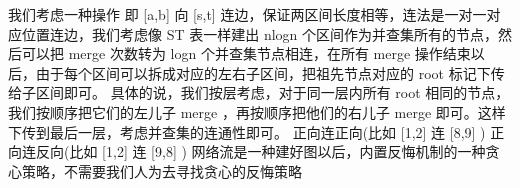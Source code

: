 {}\markdownRendererInterblockSeparator
{}
\markdownRendererSectionEnd \markdownRendererSectionBegin
{}\markdownRendererInterblockSeparator
{}我们考虑一种操作 即\markdownRendererDollarSign{} [a,b] \markdownRendererDollarSign{}向\markdownRendererDollarSign{} [s,t] \markdownRendererDollarSign{}连边，保证两区间长度相等，连法是一对一对应位置连边，我们考虑像\markdownRendererDollarSign{} ST \markdownRendererDollarSign{}表一样建出\markdownRendererDollarSign{} nlogn \markdownRendererDollarSign{}个区间作为并查集所有的节点，然后可以把\markdownRendererDollarSign{} merge \markdownRendererDollarSign{}次数转为\markdownRendererDollarSign{} logn \markdownRendererDollarSign{}个并查集节点相连，在所有\markdownRendererDollarSign{} merge \markdownRendererDollarSign{}操作结束以后，由于每个区间可以拆成对应的左右子区间，把祖先节点对应的\markdownRendererDollarSign{} root \markdownRendererDollarSign{}标记下传给子区间即可。\markdownRendererParagraphSeparator
{}具体的说，我们按层考虑，对于同一层内所有\markdownRendererDollarSign{} root \markdownRendererDollarSign{}相同的节点，我们按顺序把它们的左儿子\markdownRendererDollarSign{} merge \markdownRendererDollarSign{}，再按顺序把他们的右儿子\markdownRendererDollarSign{} merge \markdownRendererDollarSign{}即可。这样下传到最后一层，考虑并查集的连通性即可。\markdownRendererParagraphSeparator
{}正向连正向(比如\markdownRendererDollarSign{} [1,2] \markdownRendererDollarSign{}连\markdownRendererDollarSign{} [8,9] \markdownRendererDollarSign{})\markdownRendererInterblockSeparator
{}\markdownRendererInterblockSeparator
{}正向连反向(比如\markdownRendererDollarSign{} [1,2] \markdownRendererDollarSign{}连\markdownRendererDollarSign{} [9,8] \markdownRendererDollarSign{})\markdownRendererInterblockSeparator
{}\markdownRendererInterblockSeparator
{}
\markdownRendererSectionEnd \markdownRendererSectionBegin
{}\markdownRendererInterblockSeparator
{}\markdownRendererInterblockSeparator
{}
\markdownRendererSectionEnd 
\markdownRendererSectionEnd \markdownRendererSectionBegin
{}\markdownRendererInterblockSeparator
{}网络流是一种建好图以后，内置反悔机制的一种贪心策略，不需要我们人为去寻找贪心的反悔策略\markdownRendererParagraphSeparator
